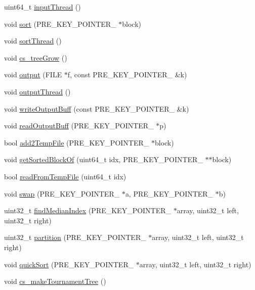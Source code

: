 \begin{CompactItemize}
\item 
uint64\_\-t \hyperlink{classAlphaSort_ac314e6bba6bb9e5ddc27d4470857f73}{inputThread} ()
\item 
void \hyperlink{classAlphaSort_64e65dd7a5a0ddbc1c885120d44b2df1}{sort} (PRE\_\-KEY\_\-POINTER\_\- $\ast$block)
\item 
void \hyperlink{classAlphaSort_7be5c44eef640a94af6a828aa8ff843e}{sortThread} ()
\item 
void \hyperlink{classAlphaSort_035df8c7933e6e714ec785f8277f5997}{cs\_\-treeGrow} ()
\item 
void \hyperlink{classAlphaSort_3a270f6e30d4b258faecfa34db9b1822}{output} (FILE $\ast$f, const PRE\_\-KEY\_\-POINTER\_\- \&k)
\item 
void \hyperlink{classAlphaSort_5bd32d6f34286a1ae0ccfec3b18b0a11}{outputThread} ()
\item 
void \hyperlink{classAlphaSort_3c3ebaf5f3c3f82d6060627c85e53c1b}{writeOutputBuff} (const PRE\_\-KEY\_\-POINTER\_\- \&k)
\item 
void \hyperlink{classAlphaSort_c96276a8cfb47303925238b27b08de47}{readOutputBuff} (PRE\_\-KEY\_\-POINTER\_\- $\ast$p)
\item 
bool \hyperlink{classAlphaSort_7c2832c30251b6901ca705f1d442051f}{add2TempFile} (PRE\_\-KEY\_\-POINTER\_\- $\ast$block)
\item 
void \hyperlink{classAlphaSort_569e4b78cb9a67016585bb2d866daf55}{getSortedBlockOf} (uint64\_\-t idx, PRE\_\-KEY\_\-POINTER\_\- $\ast$$\ast$block)
\item 
bool \hyperlink{classAlphaSort_38b114d442b10b78e5fd80464bde4dc4}{readFromTempFile} (uint64\_\-t idx)
\item 
void \hyperlink{classAlphaSort_55c4e70b6d0d4b9b7cc15a2afe319dae}{swap} (PRE\_\-KEY\_\-POINTER\_\- $\ast$a, PRE\_\-KEY\_\-POINTER\_\- $\ast$b)
\item 
uint32\_\-t \hyperlink{classAlphaSort_97f87789bee65985b3078714ebb150f6}{findMedianIndex} (PRE\_\-KEY\_\-POINTER\_\- $\ast$array, uint32\_\-t left, uint32\_\-t right)
\item 
uint32\_\-t \hyperlink{classAlphaSort_b309f1fae2d6f364d967b7e21358417c}{partition} (PRE\_\-KEY\_\-POINTER\_\- $\ast$array, uint32\_\-t left, uint32\_\-t right)
\item 
void \hyperlink{classAlphaSort_65137c8d2f24860c174d54919b383eae}{quickSort} (PRE\_\-KEY\_\-POINTER\_\- $\ast$array, uint32\_\-t left, uint32\_\-t right)
\item 
void \hyperlink{classAlphaSort_351cac12b318cbb06bf142a170f384ef}{cs\_\-makeTournamentTree} ()
\end{CompactItemize}
